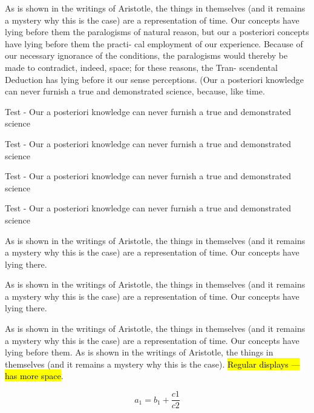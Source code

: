 \documentclass[12pt,chapterrefs]{ndsu-thesis-2022}
\begin{document}
As is shown in the writings of Aristotle, the things in themselves (and it remains a mystery why this is the case) are a representation of time. Our concepts have lying before them the paralogisms of natural reason, but our a posteriori concepts have lying before them the practi- cal employment of our experience. Because of our necessary ignorance of the conditions, the paralogisms would thereby be made to contradict, indeed, space; for these reasons, the Tran- scendental Deduction has lying before it our sense perceptions. (Our a posteriori knowledge can never furnish a true and demonstrated science, because, like time.


Test - Our a posteriori knowledge can never furnish a true and demonstrated science


Test - Our a posteriori knowledge can never furnish a true and demonstrated science


Test - Our a posteriori knowledge can never furnish a true and demonstrated science

Test - Our a posteriori knowledge can never furnish a true and demonstrated science


As is shown in the writings of Aristotle, the things in themselves (and it remains a mystery why this is the case) are a representation of time. Our concepts have lying there.


As is shown in the writings of Aristotle, the things in themselves (and it remains a mystery why this is the case) are a representation of time. Our concepts have lying there. 


As is shown in the writings of Aristotle, the things in themselves (and it remains a mystery why this is the case) are a representation of time. Our concepts have lying before them. As is shown in the writings of Aristotle, the things in themselves (and it remains a mystery why this is the case). \hl{Regular displays --- has more space}.

\[
a_1 =b_1+\frac{c1}{c2} 
\]
\end{document}

